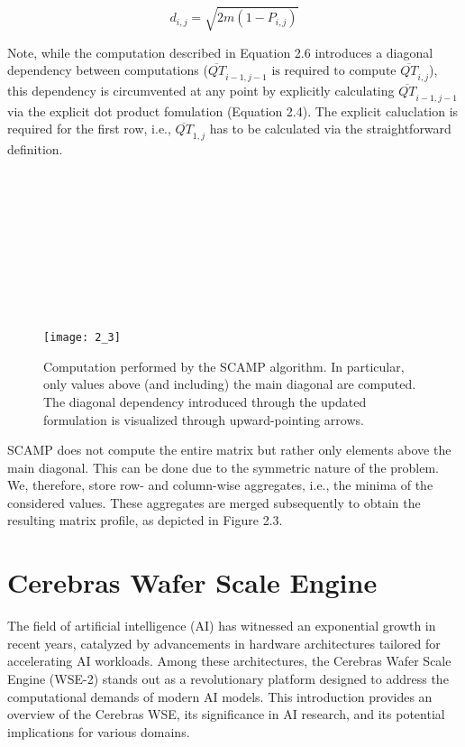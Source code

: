 \begin{equation}
    d_{i,j} = \sqrt{2m\left(1 - P_{i,j}\right)}
\end{equation}


Note, while the computation described in Equation 2.6 introduces a diagonal dependency between computations ($\overline{QT}_{i-1,j-1} \text{ is required to compute } \overline{QT}_{i,j}$), this dependency is circumvented at any point by explicitly calculating $\overline{QT}_{i-1,j-1}$ via the explicit dot product fomulation (Equation 2.4). The explicit caluclation is required for the first row, i.e., $\overline{QT}_{1,j}$ has to be calculated via the straightforward definition.\\
\\
\\
\\
\\
\\
\\
\\
\\
\\


\begin{figure}[h!]
    \texttt{[image: 2\_3]}
    \centering
    \caption{Computation performed by the SCAMP algorithm. In particular, only values
    above (and including) the main diagonal are computed. The diagonal
    dependency introduced through the updated formulation is visualized
    through upward-pointing arrows.}
\end{figure}

SCAMP does not compute the entire matrix but rather only elements above the main
diagonal. This can be done due to the symmetric nature of the problem. We, therefore,
store row- and column-wise aggregates, i.e., the minima of the considered values. These
aggregates are merged subsequently to obtain the resulting matrix profile, as depicted
in Figure 2.3.

\section{Cerebras Wafer Scale Engine}

The field of artificial intelligence (AI) has witnessed an exponential growth in recent years, catalyzed by advancements in hardware architectures tailored for accelerating AI workloads. Among these architectures, the Cerebras Wafer Scale Engine (WSE-2) stands out as a revolutionary platform designed to address the computational demands of modern AI models. This introduction provides an overview of the Cerebras WSE, its significance in AI research, and its potential implications for various domains.\\

